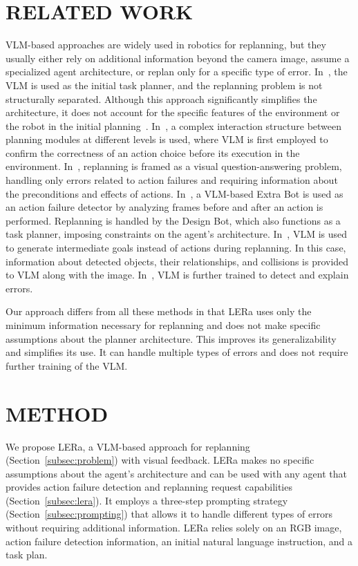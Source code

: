 \documentclass[letterpaper, 10 pt, conference]{ieeeconf}  %
\begin{document}
\section{RELATED WORK}
VLM-based approaches are widely used in robotics for replanning, but they usually either rely on additional information beyond the camera image, assume a specialized agent architecture, or replan only for a specific type of error. In~\cite{hu2023look}, the VLM is used as the initial task planner, and the replanning problem is not structurally separated. Although this approach significantly simplifies the architecture, it does not account for the specific features of the environment or the robot in the initial planning~\cite{yang2024guidinglonghorizontaskmotion}.
In~\cite{skreta2024replan}, a complex interaction structure between planning modules at different levels is used, where VLM is first employed to confirm the correctness of an action choice before its execution in the environment. In~\cite{zhang2023grounding}, replanning is framed as a visual question-answering problem, handling only errors related to action failures and requiring information about the preconditions and effects of actions.
In~\cite{mei2024replanvlm}, a VLM-based Extra Bot is used as an action failure detector by analyzing frames before and after an action is performed. Replanning is handled by the Design Bot, which also functions as a task planner, imposing constraints on the agent's architecture.
In~\cite{yang2024guidinglonghorizontaskmotion}, VLM is used to generate intermediate goals instead of actions during replanning. In this case, information about detected objects, their relationships, and collisions is provided to VLM along with the image. In~\cite{duan2024aha}, VLM is further trained to detect and explain errors.

Our approach differs from all these methods in that LERa uses only the minimum information necessary for replanning and does not make specific assumptions about the planner architecture. This improves its generalizability and simplifies its use. It can handle multiple types of errors and does not require further training of the VLM.

\section{METHOD}
\label{sec:method}
We propose LERa, a VLM-based approach for replanning (Section~\ref{subsec:problem}) with visual feedback. LERa makes no specific assumptions about the agent's architecture and can be used with any agent that provides action failure detection and replanning request capabilities (Section~\ref{subsec:lera}). It employs a three-step prompting strategy (Section~\ref{subsec:prompting}) that allows it to handle different types of errors without requiring additional information. LERa relies solely on an RGB image, action failure detection information, an initial natural language instruction, and a task plan.
\end{document}
